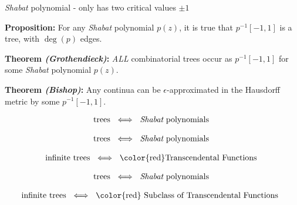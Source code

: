 \documentclass{beamer}
\begin{document}
\begin{frame}

{\it Shabat} polynomial - only has two critical values $\pm 1$

\vspace{5mm}

{\bf Proposition:} For any {\it Shabat} polynomial $p(z)$, it is true that $p^{-1}[-1,1]$ is a tree, with $\deg(p)$ edges.

\vspace{5mm} 

{\bf Theorem {\it (Grothendieck)}:} {\it ALL} combinatorial trees occur as $p^{-1}[-1,1]$ for some {\it Shabat} polynomial $p(z)$.

\vspace{5mm}

{\bf Theorem {\it (Bishop)}:} Any {\color{red} continua} can be $\epsilon$-approximated in the {\color{red} Hausdorff metric} by some $p^{-1}[-1,1]$. 

\end{frame}




\begin{frame}

\begin{align*} \text{trees }  \iff \text{ {\it Shabat} polynomials } \end{align*}

\end{frame}


\begin{frame}

\begin{align*} \text{trees }  \iff \text{ {\it Shabat} polynomials } \end{align*}

\vspace{5mm}

\begin{align*} \text{infinite trees }  \iff \text{ {\color{red}Transcendental Functions }} \end{align*}

\end{frame}


\begin{frame}

\begin{align*} \text{trees }  \iff \text{ {\it Shabat} polynomials } \end{align*}

\vspace{5mm}

\begin{align*} \text{infinite trees }  \iff \text{ {\color{red} Subclass of Transcendental Functions } } \end{align*}

\end{frame}
\end{document}

